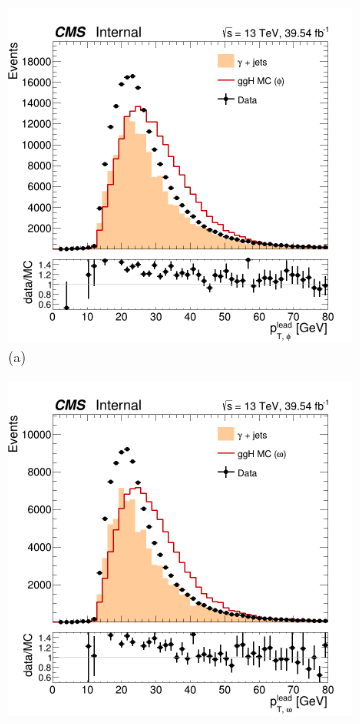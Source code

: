 \begin{figure}[!ht]
    \captionsetup[subfigure]{labelformat=empty}
    \vspace*{-0.2cm}
    \centering
    \setlength{\mylength}{\textwidth}
    \begin{subfigure}[t]{0.50\mylength}
        \centering
        \includegraphics[width=0.49\mylength]{resources/plots/Phi3_lead_pt.png}
        \vspace*{-0.2cm}
        \caption{\footnotesize (a)}
    \end{subfigure}%
    \begin{subfigure}[t]{0.50\mylength}
        \centering
        \includegraphics[width=0.49\mylength]{resources/plots/Omega_lead_pt.png}

\end{subfigure}
\end{figure}
